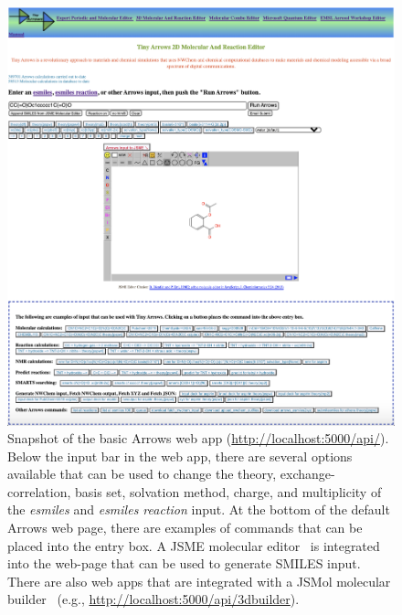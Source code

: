 \documentclass[runningheads,a4paper]{llncs}
\begin{document}
\begin{figure}[!H]
   \centering
   \includegraphics[width=\textwidth]{images/JSME-Input4.png}
   \caption{Snapshot of the basic Arrows web app (\url{http://localhost:5000/api/}).  Below the input bar in the web app, there are several options available that can be used to change the theory, exchange-correlation, basis set, solvation method, charge,  and multiplicity of the \textit{esmiles} and \textit{esmiles reaction} input.  At the bottom of the default Arrows web page, there are examples of commands that can be placed into the entry box.  A JSME molecular editor~\cite{bienfait2013jsme} is integrated into the web-page that can be used to generate SMILES input.  There are also web apps that are integrated with a JSMol molecular builder~\cite{hanson2010jmol,hanson2013jsmol} (e.g., \url{http://localhost:5000/api/3dbuilder}). }
   \label{fig.arrows.input}
\end{figure}
\end{document}
